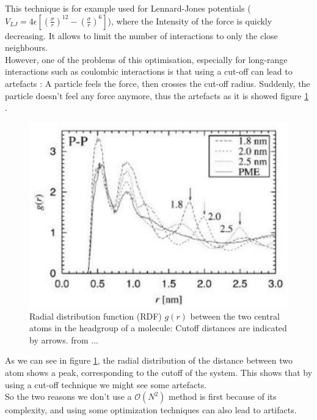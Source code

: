 \documentclass[12pt,twoside,a4paper]{report}
\begin{document}
This technique is for example used for Lennard-Jones potentials ($V_{LJ} = 4\epsilon [(\frac{\sigma}{r})^12 - (\frac{\sigma}{r})^6] $), where the Intensity of the force is quickly decreasing. It allows to limit the number of interactions to only the close neighbours.\\

However, one of the problems of this optimisation, especially for long-range interactions such as coulombic interactions is that using a cut-off can lead to artefacts : A particle feels the force, then crosses the cut-off radius. Suddenly, the particle doesn't feel any force anymore, thus the artefacts as it is showed figure \ref{fig:artefact} .

\begin{figure}[H]

\includegraphics[scale=0.8]{artefact}
 \centering
 
\caption{Radial distribution function (RDF) $g(r)$ between the two
central atoms in the headgroup of a molecule: Cutoff distances are indicated by arrows. from ...}

\label{fig:artefact}

\end{figure}


As we can see in figure \ref{fig:artefact},  the radial distribution of the distance between two atom shows a peak, corresponding to the cutoff of the system. This shows that by using a cut-off technique we might see some artefacts.\\

So the two reasons we don't use a $\mathcal{O}(N^2)$ method is first because of its complexity, and using some optimization techniques can also lead to artifacts.
\end{document}
